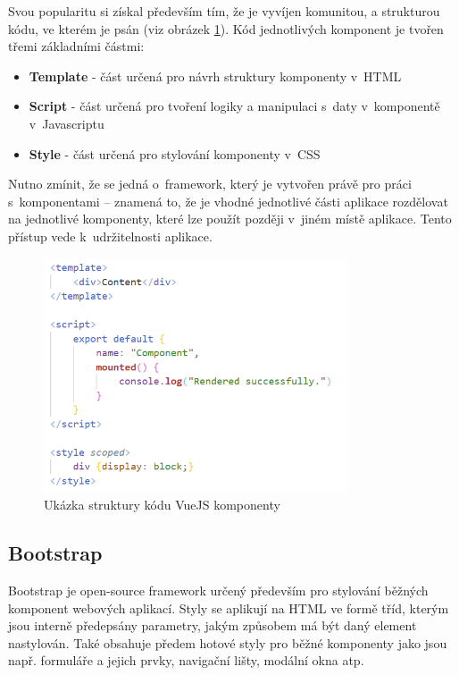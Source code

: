 	Svou popularitu si získal především tím, že je vyvíjen komunitou, a strukturou kódu, ve kterém je psán (viz obrázek \ref{fig:vue_kod_komponenty}). Kód jednotlivých komponent je tvořen třemi základními částmi:
	
	\begin{itemize}
		\item \textbf{Template} - část určená pro návrh struktury komponenty v~HTML
		\item \textbf{Script} - část určená pro tvoření logiky a manipulaci s~daty v~komponentě v~Javascriptu
		\item \textbf{Style} - část určená pro stylování komponenty v~CSS
	\end{itemize}

	Nutno zmínit, že se jedná o~framework, který je vytvořen právě pro práci s~komponentami – znamená to, že je vhodné jednotlivé části aplikace rozdělovat na jednotlivé komponenty, které lze použít později v~jiném místě aplikace. Tento přístup vede k~udržitelnosti aplikace. \cite{VueJSSyntax}\cite{VueJS2}
	
	\begin{figure}[h]
		\centering
		\includegraphics[width=0.8\textwidth]{img/vue_kod_komponenty.png}
		\caption{Ukázka struktury kódu VueJS komponenty}
		\label{fig:vue_kod_komponenty}
	\end{figure}
	
	\subsection{Bootstrap}
	Bootstrap je open-source framework určený především pro stylování běžných komponent webových aplikací. Styly se aplikují na HTML ve formě tříd, kterým jsou interně předepsány parametry, jakým způsobem má být daný element nastylován. Také obsahuje předem hotové styly pro běžné komponenty jako jsou např. formuláře a jejich prvky, navigační lišty, modální okna atp. \cite{Bootstrap1}\cite{Bootstrap2}\cite{Bootstrap3}
	
